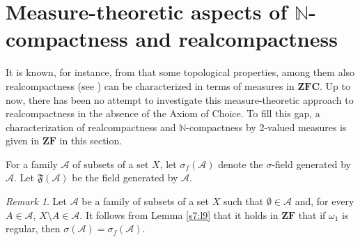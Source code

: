 \documentclass[12pt,twoside,leqno]{article}
\theoremstyle{plain}
\theoremstyle{definition}
\theoremstyle{remark}
\newtheorem{remark}[theorem]{Remark}
\begin{document}
\section{Measure-theoretic aspects of $\mathbb{N}$-compactness and realcompactness}
\label{s8}

It is known, for instance, from \cite[Chapter VIII.4]{nag} that some topological properties, among them also realcompactness (see \cite[Theorem VIII.14]{nag}) can be characterized in terms of measures in $\mathbf{ZFC}$. Up to now, there has been no attempt to investigate this measure-theoretic approach to realcompactness in the absence of the Axiom of Choice. To fill this gap, a characterization of realcompactness and $\mathbb{N}$-compactness by 2-valued measures is given in $\mathbf{ZF}$ in this section. 

For a family $\mathcal{A}$ of subsets of a set $X$, let $\sigma_f(\mathcal{A})$ denote the $\sigma$-field generated by $\mathcal{A}$. Let $\mathfrak{F}(\mathcal{A})$ be the field generated by $\mathcal{A}$.

\begin{remark}
	\label{s8:r1}
	Let $\mathcal{A}$ be a family of subsets of a set $X$ such that $\emptyset\in\mathcal{A}$ and, for every $A\in\mathcal{A}$, $X\setminus A\in\mathcal{A}$. It follows from Lemma \ref{s7:l9} that it holds in $\mathbf{ZF}$ that if $\omega_1$ is regular, then $\sigma(\mathcal{A})=\sigma_f(\mathcal{A})$.
\end{remark}
\end{document}
